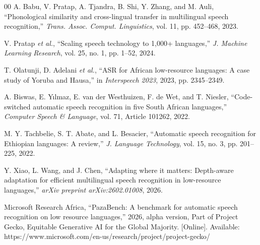 \documentclass[conference]{IEEEtran}
\begin{document}
\begin{thebibliography}{00}
 A. Babu, V. Pratap, A. Tjandra, B. Shi, Y. Zhang, and M. Auli, ``Phonological similarity and cross-lingual transfer in multilingual speech recognition,'' \textit{Trans. Assoc. Comput. Linguistics}, vol. 11, pp. 452--468, 2023.

 V. Pratap \textit{et al.}, ``Scaling speech technology to 1,000+ languages,'' \textit{J. Machine Learning Research}, vol. 25, no. 1, pp. 1--52, 2024.

 T. Olatunji, D. Adelani \textit{et al.}, ``ASR for African low-resource languages: A case study of Yoruba and Hausa,'' in \textit{Interspeech 2023}, 2023, pp. 2345--2349.

 A. Biswas, E. Y{\i}lmaz, E. van der Westhuizen, F. de Wet, and T. Niesler, ``Code-switched automatic speech recognition in five South African languages,'' \textit{Computer Speech \& Language}, vol. 71, Article 101262, 2022.

 M. Y. Tachbelie, S. T. Abate, and L. Besacier, ``Automatic speech recognition for Ethiopian languages: A review,'' \textit{J. Language Technology}, vol. 15, no. 3, pp. 201--225, 2022.

 Y. Xiao, L. Wang, and J. Chen, ``Adapting where it matters: Depth-aware adaptation for efficient multilingual speech recognition in low-resource languages,'' \textit{arXiv preprint arXiv:2602.01008}, 2026.

 Microsoft Research Africa, ``PazaBench: A benchmark for automatic speech recognition on low resource languages,'' 2026, alpha version, Part of Project Gecko, Equitable Generative AI for the Global Majority. [Online]. Available: https://www.microsoft.com/en-us/research/project/project-gecko/

\end{thebibliography}
\end{document}
